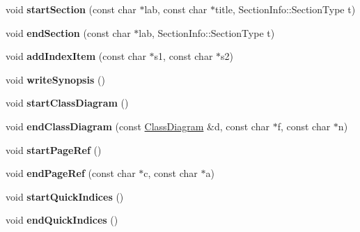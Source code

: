 \begin{DoxyCompactItemize}
\mbox{\label{class_output_list_a9a1d1f6dbf37a65e8ebe099e8c3dd5cf}} 
void {\bfseries start\+Section} (const char $\ast$lab, const char $\ast$title, Section\+Info\+::\+Section\+Type t)
\item 
\mbox{\label{class_output_list_ae50a2aac014352256bd3772f4e98237e}} 
void {\bfseries end\+Section} (const char $\ast$lab, Section\+Info\+::\+Section\+Type t)
\item 
\mbox{\label{class_output_list_a4d682e57f5f0365a943aeb116ccbfc45}} 
void {\bfseries add\+Index\+Item} (const char $\ast$s1, const char $\ast$s2)
\item 
\mbox{\label{class_output_list_a7d9096a6b81f3183e6f3dc01e4e093f5}} 
void {\bfseries write\+Synopsis} ()
\item 
\mbox{\label{class_output_list_a10f734424e06f796ca4c962e0017d8b6}} 
void {\bfseries start\+Class\+Diagram} ()
\item 
\mbox{\label{class_output_list_ad860823413ef3d95be741afa1e469cb9}} 
void {\bfseries end\+Class\+Diagram} (const \mbox{\hyperlink{class_class_diagram}{Class\+Diagram}} \&d, const char $\ast$f, const char $\ast$n)
\item 
\mbox{\label{class_output_list_a6f14fd99b68f6df4f9510dbc627f5a43}} 
void {\bfseries start\+Page\+Ref} ()
\item 
\mbox{\label{class_output_list_ab6eef37e9e241eeb7a53709f338be0a7}} 
void {\bfseries end\+Page\+Ref} (const char $\ast$c, const char $\ast$a)
\item 
\mbox{\label{class_output_list_a74849c1452e8884292ed85bf7c22f2bc}} 
void {\bfseries start\+Quick\+Indices} ()
\item 
\mbox{\label{class_output_list_ab1da800b31634af3c518bfa8c0b8323b}} 
void {\bfseries end\+Quick\+Indices} ()
\item 
\mbox{\label{class_output_list_a8633e58cc787bddad99efb8fabea3172}} 

\end{DoxyCompactItemize}
